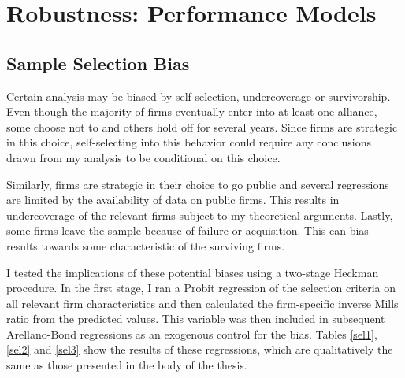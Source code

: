 \chapter{Robustness: Performance Models\label{apndxB}}

\section{Sample Selection Bias}

Certain analysis may be biased by self selection, undercoverage or survivorship. Even though the majority of firms eventually enter into at least one alliance, some choose not to and others hold off for several years. Since firms are strategic in this choice, self-selecting into this behavior could require any conclusions drawn from my analysis to be conditional on this choice. 

Similarly, firms are strategic in their choice to go public and several regressions are limited by the availability of data on public firms. This results in undercoverage of the relevant firms subject to my theoretical arguments. Lastly, some firms leave the sample because of failure or acquisition. This can bias results towards some characteristic of the surviving firms.

I tested the implications of these potential biases using a two-stage Heckman procedure. In the first stage, I ran a Probit regression of the selection criteria on all relevant firm characteristics and then calculated the firm-specific inverse Mills ratio from the predicted values. This variable was then included in subsequent Arellano-Bond regressions as an exogenous control for the bias. Tables \ref{sel1}, \ref{sel2} and \ref{sel3} show the results of these regressions, which are qualitatively the same as those presented in the body of the thesis.

